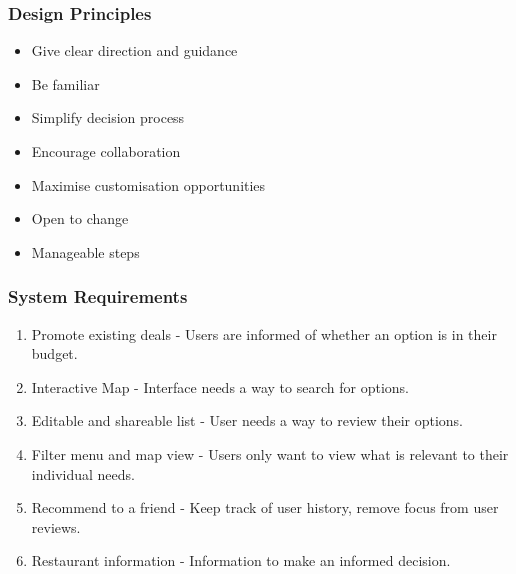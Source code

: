 \documentclass[a4 paper, 12pt]{article}
\begin{document}
        \subsubsection{Design Principles}
        \begin{multicols}{2}    
            \begin{itemize}
                \item Give clear direction and guidance
                \item Be familiar
                \item Simplify decision process
                \item Encourage collaboration
                \item Maximise customisation opportunities
                \item Open to change
                \item Manageable steps
            \end{itemize}
        \end{multicols}

        \subsubsection{System Requirements}
            \begin{enumerate}
                \item Promote existing deals - Users are informed of whether an option is in their budget.
                \item Interactive Map - Interface needs a way to search for options.
                \item Editable and shareable list - User needs a way to review their options.
                \item Filter menu and map view - Users only want to view what is relevant to their individual needs.
                \item Recommend to a friend - Keep track of user history, remove focus from user reviews.      
                \item Restaurant information - Information to make an informed decision.
            \end{enumerate}   
\end{document}
